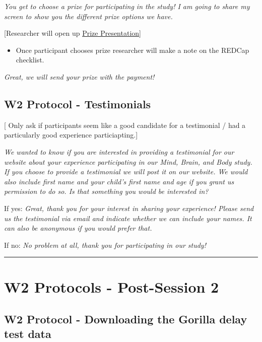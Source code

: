 \documentclass[
]{book}
\providecommand{\tightlist}{%
  \setlength{\itemsep}{0pt}\setlength{\parskip}{0pt}}
\begin{document}
\emph{You get to choose a prize for participating in the study! I am going to share my screen to show you the different prize options we have.}

{[}Researcher will open up \href{https://app.box.com/file/780536035674}{Prize Presentation}{]}

\begin{itemize}
\tightlist
\item
  Once participant chooses prize researcher will make a note on the REDCap checklist.
\end{itemize}

\emph{Great, we will send your prize with the payment!}

\hypertarget{w2-protocol---testimonials}{%
\subsection{W2 Protocol - Testimonials}\label{w2-protocol---testimonials}}

{[} Only ask if participants seem like a good candidate for a testimonial / had a particularly good experience particiapting.{]}

\emph{We wanted to know if you are interested in providing a testimonial for our website about your experience participating in our Mind, Brain, and Body study. If you choose to provide a testimonial we will post it on our website. We would also include first name and your child's first name and age if you grant us permission to do so. Is that something you would be interested in?}

If yes: \emph{Great, thank you for your interest in sharing your experience! Please send us the testimonial via email and indicate whether we can include your names. It can also be anonymous if you would prefer that.}

If no: \emph{No problem at all, thank you for participating in our study!}

\begin{center}\rule{0.5\linewidth}{0.5pt}\end{center}

\hypertarget{w2-protocols---post-session-2}{%
\section{W2 Protocols - Post-Session 2}\label{w2-protocols---post-session-2}}

\hypertarget{w2-protocol---downloading-the-gorilla-delay-test-data}{%
\subsection{W2 Protocol - Downloading the Gorilla delay test data}\label{w2-protocol---downloading-the-gorilla-delay-test-data}}
\end{document}
